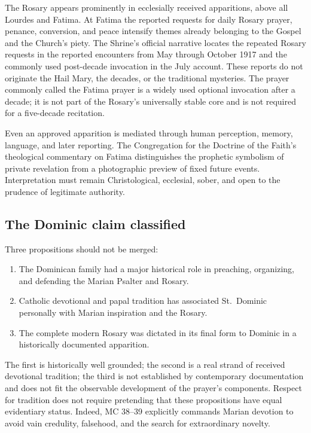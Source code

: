 The Rosary appears prominently in ecclesially received apparitions, above all Lourdes and Fatima. At Fatima the reported requests for daily Rosary prayer, penance, conversion, and peace intensify themes already belonging to the Gospel and the Church's piety. The Shrine's official narrative locates the repeated Rosary requests in the reported encounters from May through October 1917 and the commonly used post-decade invocation in the July account. These reports do not originate the Hail Mary, the decades, or the traditional mysteries. The prayer commonly called the Fatima prayer is a widely used optional invocation after a decade; it is not part of the Rosary's universally stable core and is not required for a five-decade recitation.

Even an approved apparition is mediated through human perception, memory, language, and later reporting. The Congregation for the Doctrine of the Faith's theological commentary on Fatima distinguishes the prophetic symbolism of private revelation from a photographic preview of fixed future events. Interpretation must remain Christological, ecclesial, sober, and open to the prudence of legitimate authority.

\subsection{The Dominic claim classified}

Three propositions should not be merged:

\begin{enumerate}
  \item The Dominican family had a major historical role in preaching, organizing, and defending the Marian Psalter and Rosary.
  \item Catholic devotional and papal tradition has associated St.~Dominic personally with Marian inspiration and the Rosary.
  \item The complete modern Rosary was dictated in its final form to Dominic in a historically documented apparition.
\end{enumerate}

The first is historically well grounded; the second is a real strand of received devotional tradition; the third is not established by contemporary documentation and does not fit the observable development of the prayer's components. Respect for tradition does not require pretending that these propositions have equal evidentiary status. Indeed, MC 38--39 explicitly commands Marian devotion to avoid vain credulity, falsehood, and the search for extraordinary novelty.

